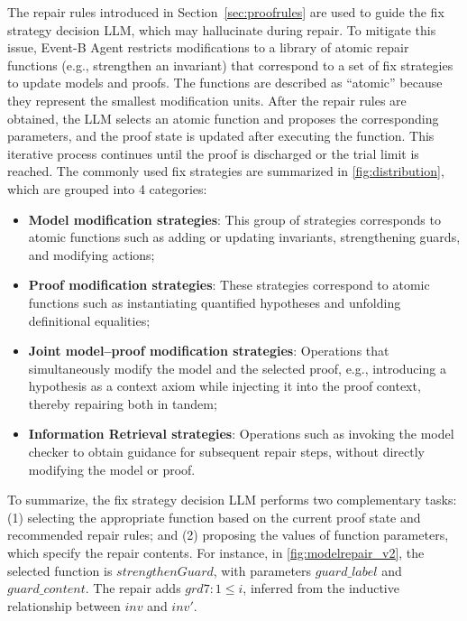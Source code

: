 The repair rules introduced in Section~\ref{sec:proofrules} are used to guide the fix strategy decision LLM, which may hallucinate during repair.
To mitigate this issue, Event-B Agent restricts modifications to a library of atomic repair functions (e.g., strengthen an invariant) that correspond to a set of fix strategies to update models and proofs.
The functions are described as ``atomic'' because they represent the smallest modification units.
After the repair rules are obtained, the LLM selects an atomic function and proposes the corresponding parameters, and the proof state is updated after executing the function.
This iterative process continues until the proof is discharged or the trial limit is reached.
The commonly used fix strategies are summarized in \autoref{fig:distribution}, which are grouped into 4 categories:
\begin{itemize}
    \item \textbf{Model modification strategies}: This group of strategies corresponds to atomic functions such as adding or updating invariants, strengthening guards, and modifying actions;
    \item \textbf{Proof modification strategies}: These strategies correspond to atomic functions such as instantiating quantified hypotheses and unfolding definitional equalities;
    \item \textbf{Joint model–proof modification strategies}: Operations that simultaneously modify the model and the selected proof, e.g., introducing a hypothesis as a context axiom while injecting it into the proof context, thereby repairing both in tandem;
    \item \textbf{Information Retrieval strategies}: Operations such as invoking the model checker to obtain guidance for subsequent repair steps, without directly modifying the model or proof.
\end{itemize}

To summarize, the fix strategy decision LLM performs two complementary tasks: 
(1) selecting the appropriate function based on the current proof state and recommended repair rules; and 
(2) proposing the values of function parameters, which specify the repair contents.
For instance, in \autoref{fig:modelrepair_v2}, the selected function is $strengthenGuard$, with parameters $guard\_label$ and $guard\_content$.
The repair adds $grd7:1 \leq i$, inferred from the inductive relationship between $inv$ and $inv'$.


